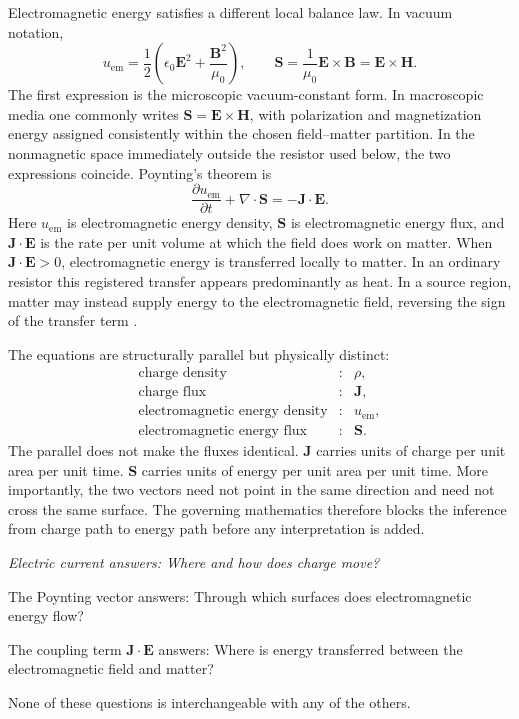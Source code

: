 \documentclass[12pt,onecolumn]{article}
\begin{document}
Electromagnetic energy satisfies a different local balance law. In vacuum notation,
\[
u_{\mathrm{em}}=\frac{1}{2}\left(\epsilon_0\mathbf E^2+\frac{\mathbf B^2}{\mu_0}\right),
\qquad
\mathbf S=\frac{1}{\mu_0}\mathbf E\times\mathbf B
=\mathbf E\times\mathbf H.
\]
The first expression is the microscopic vacuum-constant form. In macroscopic media one commonly writes $\mathbf S=\mathbf E\times\mathbf H$, with polarization and magnetization energy assigned consistently within the chosen field--matter partition. In the nonmagnetic space immediately outside the resistor used below, the two expressions coincide.
Poynting's theorem is
\[
\frac{\partial u_{\mathrm{em}}}{\partial t}
+\nabla\cdot\mathbf S
=-\mathbf J\cdot\mathbf E.
\]
Here $u_{\mathrm{em}}$ is electromagnetic energy density, $\mathbf S$ is electromagnetic energy flux, and $\mathbf J\cdot\mathbf E$ is the rate per unit volume at which the field does work on matter. When $\mathbf J\cdot\mathbf E>0$, electromagnetic energy is transferred locally to matter. In an ordinary resistor this registered transfer appears predominantly as heat. In a source region, matter may instead supply energy to the electromagnetic field, reversing the sign of the transfer term \cite{poynting1884,feynman,hausmelcher}.

The equations are structurally parallel but physically distinct:
\[
\begin{array}{rcl}
\text{charge density} &:& \rho,\\
\text{charge flux} &:& \mathbf J,\\[0.3em]
\text{electromagnetic energy density} &:& u_{\mathrm{em}},\\
\text{electromagnetic energy flux} &:& \mathbf S.
\end{array}
\]
The parallel does not make the fluxes identical. $\mathbf J$ carries units of charge per unit area per unit time. $\mathbf S$ carries units of energy per unit area per unit time. More importantly, the two vectors need not point in the same direction and need not cross the same surface. The governing mathematics therefore blocks the inference from charge path to energy path before any interpretation is added.

\begin{mdframed}[linewidth=0.8pt, innertopmargin=10pt, innerbottommargin=10pt, innerrightmargin=14pt, innerleftmargin=14pt, backgroundcolor=gray!15, leftmargin=0.33in, rightmargin=0.33in]
\normalsize\itshape
Electric current answers: Where and how does charge move?

\medskip

The Poynting vector answers: Through which surfaces does electromagnetic energy flow?

\medskip

The coupling term $\mathbf J\cdot\mathbf E$ answers: Where is energy transferred between the electromagnetic field and matter?

\medskip

None of these questions is interchangeable with any of the others.
\end{mdframed}
\end{document}
